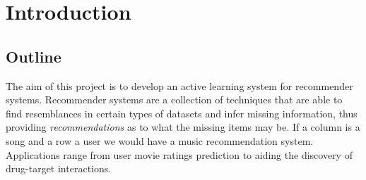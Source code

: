 \chapter{Introduction}
\ifpdf
    \graphicspath{{Introduction/IntroductionFigs/PNG/}{Introduction/IntroductionFigs/PDF/}{Introduction/IntroductionFigs/}}
\else
    \graphicspath{{Introduction/IntroductionFigs/EPS/}{Introduction/IntroductionFigs/}}
\fi
{}
\section{Outline}
The aim of this project is to develop an active learning system for recommender systems. Recommender systems are a collection of techniques that are able to find resemblances in certain types of datasets and infer missing information, thus providing \emph{recommendations} as to what the missing items may be. If a column is a song and a row a user we would have a music recommendation system. Applications range from user movie ratings prediction to aiding the discovery of drug-target interactions.






